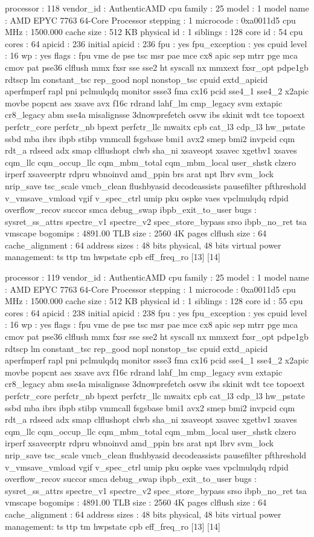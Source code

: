 processor	: 118
vendor_id	: AuthenticAMD
cpu family	: 25
model		: 1
model name	: AMD EPYC 7763 64-Core Processor
stepping	: 1
microcode	: 0xa0011d5
cpu MHz		: 1500.000
cache size	: 512 KB
physical id	: 1
siblings	: 128
core id		: 54
cpu cores	: 64
apicid		: 236
initial apicid	: 236
fpu		: yes
fpu_exception	: yes
cpuid level	: 16
wp		: yes
flags		: fpu vme de pse tsc msr pae mce cx8 apic sep mtrr pge mca cmov pat pse36 clflush mmx fxsr sse sse2 ht syscall nx mmxext fxsr_opt pdpe1gb rdtscp lm constant_tsc rep_good nopl nonstop_tsc cpuid extd_apicid aperfmperf rapl pni pclmulqdq monitor ssse3 fma cx16 pcid sse4_1 sse4_2 x2apic movbe popcnt aes xsave avx f16c rdrand lahf_lm cmp_legacy svm extapic cr8_legacy abm sse4a misalignsse 3dnowprefetch osvw ibs skinit wdt tce topoext perfctr_core perfctr_nb bpext perfctr_llc mwaitx cpb cat_l3 cdp_l3 hw_pstate ssbd mba ibrs ibpb stibp vmmcall fsgsbase bmi1 avx2 smep bmi2 invpcid cqm rdt_a rdseed adx smap clflushopt clwb sha_ni xsaveopt xsavec xgetbv1 xsaves cqm_llc cqm_occup_llc cqm_mbm_total cqm_mbm_local user_shstk clzero irperf xsaveerptr rdpru wbnoinvd amd_ppin brs arat npt lbrv svm_lock nrip_save tsc_scale vmcb_clean flushbyasid decodeassists pausefilter pfthreshold v_vmsave_vmload vgif v_spec_ctrl umip pku ospke vaes vpclmulqdq rdpid overflow_recov succor smca debug_swap ibpb_exit_to_user
bugs		: sysret_ss_attrs spectre_v1 spectre_v2 spec_store_bypass srso ibpb_no_ret tsa vmscape
bogomips	: 4891.00
TLB size	: 2560 4K pages
clflush size	: 64
cache_alignment	: 64
address sizes	: 48 bits physical, 48 bits virtual
power management: ts ttp tm hwpstate cpb eff_freq_ro [13] [14]

processor	: 119
vendor_id	: AuthenticAMD
cpu family	: 25
model		: 1
model name	: AMD EPYC 7763 64-Core Processor
stepping	: 1
microcode	: 0xa0011d5
cpu MHz		: 1500.000
cache size	: 512 KB
physical id	: 1
siblings	: 128
core id		: 55
cpu cores	: 64
apicid		: 238
initial apicid	: 238
fpu		: yes
fpu_exception	: yes
cpuid level	: 16
wp		: yes
flags		: fpu vme de pse tsc msr pae mce cx8 apic sep mtrr pge mca cmov pat pse36 clflush mmx fxsr sse sse2 ht syscall nx mmxext fxsr_opt pdpe1gb rdtscp lm constant_tsc rep_good nopl nonstop_tsc cpuid extd_apicid aperfmperf rapl pni pclmulqdq monitor ssse3 fma cx16 pcid sse4_1 sse4_2 x2apic movbe popcnt aes xsave avx f16c rdrand lahf_lm cmp_legacy svm extapic cr8_legacy abm sse4a misalignsse 3dnowprefetch osvw ibs skinit wdt tce topoext perfctr_core perfctr_nb bpext perfctr_llc mwaitx cpb cat_l3 cdp_l3 hw_pstate ssbd mba ibrs ibpb stibp vmmcall fsgsbase bmi1 avx2 smep bmi2 invpcid cqm rdt_a rdseed adx smap clflushopt clwb sha_ni xsaveopt xsavec xgetbv1 xsaves cqm_llc cqm_occup_llc cqm_mbm_total cqm_mbm_local user_shstk clzero irperf xsaveerptr rdpru wbnoinvd amd_ppin brs arat npt lbrv svm_lock nrip_save tsc_scale vmcb_clean flushbyasid decodeassists pausefilter pfthreshold v_vmsave_vmload vgif v_spec_ctrl umip pku ospke vaes vpclmulqdq rdpid overflow_recov succor smca debug_swap ibpb_exit_to_user
bugs		: sysret_ss_attrs spectre_v1 spectre_v2 spec_store_bypass srso ibpb_no_ret tsa vmscape
bogomips	: 4891.00
TLB size	: 2560 4K pages
clflush size	: 64
cache_alignment	: 64
address sizes	: 48 bits physical, 48 bits virtual
power management: ts ttp tm hwpstate cpb eff_freq_ro [13] [14]

